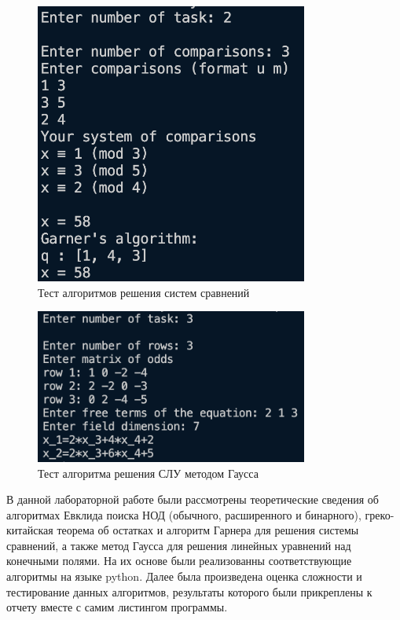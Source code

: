 \documentclass[bachelor, och, labwork]{SCWorks}
\begin{document}
        \begin{figure}[H]
            \centering
            \includegraphics[width=0.8\textwidth]{pic/2.png}
            \caption{Тест алгоритмов решения систем сравнений}
        \end{figure}

        \begin{figure}[H]
            \centering
            \includegraphics[width=0.8\textwidth]{pic/3.png}
            \caption{Тест алгоритма решения СЛУ методом Гаусса}
        \end{figure}


\conclusion

    В данной лабораторной работе были рассмотрены теоретические сведения об
    алгоритмах Евклида поиска НОД (обычного, расширенного и бинарного), 
    греко-китайская теорема об остатках и алгоритм Гарнера для решения системы сравнений,
    а также метод Гаусса для решения линейных уравнений над
    конечными полями. На их основе были реализованны соответствующие алгоритмы на языке python.
    Далее была произведена оценка сложности и тестирование данных алгоритмов, результаты которого были прикреплены к отчету вместе с
    самим листингом программы.
\end{document}

